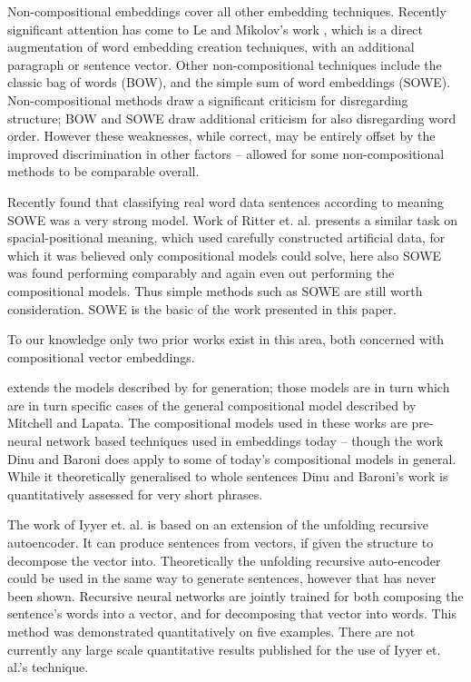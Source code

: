 \documentclass[]{scrartcl}
\numberwithin{equation}{section}
\numberwithin{figure}{section}
\theoremstyle{plain}
\theoremstyle{definition}
\begin{document}
Non-compositional embeddings cover all other embedding techniques. Recently significant attention has come to Le and Mikolov's work \cite{le2014distributed}, which is a direct augmentation of word embedding creation techniques, with an additional paragraph or sentence vector. Other non-compositional techniques include the classic bag of words (BOW), and the simple sum of word embeddings (SOWE). Non-compositional methods draw a significant criticism for disregarding structure; BOW and SOWE draw additional criticism for also disregarding word order. However these weaknesses, while correct, may be entirely offset by the improved discrimination in other factors -- allowed for some non-compositional methods to be comparable overall. 


Recently \cite{White2015SentVecMeaning} found that classifying real word data sentences according to meaning SOWE was a very strong model. Work of Ritter et. al. presents a similar task on spacial-positional meaning, which used carefully constructed artificial data, for which it was believed only compositional models could solve, here also SOWE was found performing comparably and again even out performing the compositional models. Thus simple methods such as SOWE are still worth consideration. SOWE is the basic of the work presented in this paper.


To our knowledge only two prior works exist in this area, both concerned with compositional vector embeddings.

\cite{Dinu2014CompositionalGeneration}  extends the models described by \cite{zanzotto2010estimating, Guevara2010} for generation; those models are in turn which are in turn specific cases of the general compositional model described by Mitchell and Lapata\cite{Mitchell2008}. The compositional models used in these works are pre-neural network based techniques used in embeddings today -- though the work Dinu and Baroni does apply to some of today's compositional models in general. While it theoretically generalised to whole sentences Dinu and Baroni's work is quantitatively assessed for very short phrases.


The work of Iyyer et. al. \cite{iyyer2014generating} is based on an extension of the unfolding recursive autoencoder\cite{SocherEtAl2011:PoolRAE}. It can produce sentences from vectors, if given the structure to decompose the vector into. Theoretically the unfolding recursive auto-encoder could be used in the same way to generate sentences, however that has never been shown. Recursive neural networks are jointly trained for both composing the sentence's words into a vector, and for decomposing that vector into words. This method was demonstrated quantitatively on five examples. There are not currently any large scale quantitative results published for the use of Iyyer et. al.'s technique.
\end{document}

